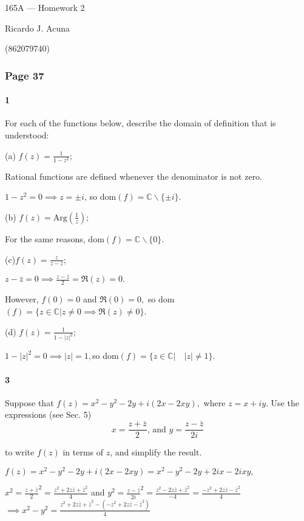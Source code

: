 \documentclass{article}
\newcommand\C{\mathbb{C}}
\begin{document}
\begin{center}
  165A --- Homework 2

  Ricardo J. Acuna

  (862079740)
\end{center}\vspace{1.618em}

\subsubsection*{Page 37}

\paragraph{1} For each of the functions below, describe the domain of
definition that is understood:

(a) $f(z) = \frac{1}{1-z^2};$

Rational functions are defined whenever the denominator is not zero.

$1-z^2 = 0 \implies z=\pm i$, so dom$(f) = \C\backslash \{\pm i\}.$

(b) $f(z) = \text{Arg}(\frac{1}{z});$

For the same reasons, dom$(f) = \C\backslash \{0\}.$

(c)$f(z) = \frac{z}{z-\bar{z}}$;

$z-\bar{z} = 0 \implies \frac{z-\bar{z}}{2} = \Re(z) = 0.$

However, $f(0)= 0$ and $\Re(0) = 0,$ so dom$(f) = \{z\in\C | z\neq 0
  \implies \Re(z) \neq 0\}$.

(d) $f(z) = \frac{1}{1-|z|^2}$;

$1-|z|^2 = 0 \implies |z| = 1, $so dom$(f) = \{z \in \C|\quad |z| \neq 1\}$.

\paragraph{3} Suppose that $f(z) = x^2-y^2 -2y +i(2x -2xy),$ where $z
= x+iy$. Use the expressions (see Sec. 5)
\[x = \frac{z+\bar{z}}{2} \text{, and } y = \frac{z-\bar{z}}{2i}\]

to write $f(z)$ in terms of $z$, and simplify the result.


$f(z) = x^2-y^2 -2y +i(2x -2xy) = x^2 -y^2 -2y +2ix -2ixy,$

$x^2 = \frac{z+\bar{z}}{2}^2 = \frac{z^2 +2z\bar{z} +\bar{z}^2}{4}$
and
$y^2 = \frac{z-\bar{z}}{2i}^2 = \frac{z^2 -2z\bar{z} +\bar{z}^2}{-4} = \frac{-z^2 +2z\bar{z} -\bar{z}^2}{4}
$
$\implies x^2 - y^2 = \frac{z^2 +2z\bar{z} +\bar{z}^2 -(-z^2
  +2z\bar{z} -\bar{z}^2)}{4}$
\end{document}
